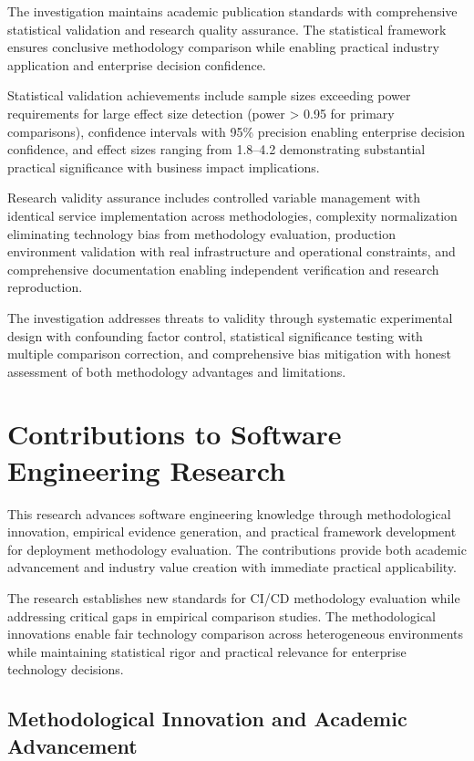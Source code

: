 The investigation maintains academic publication standards with comprehensive statistical validation and research quality assurance. The statistical framework ensures conclusive methodology comparison while enabling practical industry application and enterprise decision confidence.

Statistical validation achievements include sample sizes exceeding power requirements for large effect size detection (power > 0.95 for primary comparisons), confidence intervals with 95\% precision enabling enterprise decision confidence, and effect sizes ranging from 1.8--4.2 demonstrating substantial practical significance with business impact implications.

Research validity assurance includes controlled variable management with identical service implementation across methodologies, complexity normalization eliminating technology bias from methodology evaluation, production environment validation with real infrastructure and operational constraints, and comprehensive documentation enabling independent verification and research reproduction.

The investigation addresses threats to validity through systematic experimental design with confounding factor control, statistical significance testing with multiple comparison correction, and comprehensive bias mitigation with honest assessment of both methodology advantages and limitations.

\section{Contributions to Software Engineering Research}
\label{sec:research_contributions}

This research advances software engineering knowledge through methodological innovation, empirical evidence generation, and practical framework development for deployment methodology evaluation. The contributions provide both academic advancement and industry value creation with immediate practical applicability.

The research establishes new standards for CI/CD methodology evaluation while addressing critical gaps in empirical comparison studies. The methodological innovations enable fair technology comparison across heterogeneous environments while maintaining statistical rigor and practical relevance for enterprise technology decisions.

\subsection{Methodological Innovation and Academic Advancement}
\label{subsec:methodological_innovation}

